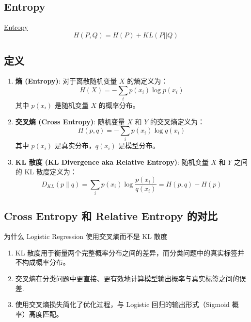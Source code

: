 \documentclass[12pt]{article}
\numberwithin{theorem}{section} %
\numberwithin{definition}{section} %
\numberwithin{assumption}{section} %
\numberwithin{lemma}{section} %
\numberwithin{remark}{section} %
\numberwithin{prop}{section} %
\numberwithin{corollary}{section} %
\numberwithin{example}{section} %
\numberwithin{question}{section} %
\numberwithin{problem}{section} %
\numberwithin{conjecture}{section} %
\numberwithin{append}{section} %
\numberwithin{property}{section} %
\begin{document}
\begin{CJK}{UTF8}{gbsn}
\section{Entropy}
\href{https://www.iitg.ac.in/cseweb/osint/slides/Anasua_Entropy.pdf}{Entropy} 
\begin{equation}
	H(P,Q) = H(P) + KL(P||Q)
\end{equation}

	
\subsection{定义}
	
	\begin{enumerate}
		\item \textbf{熵 (Entropy)}: 对于离散随机变量 \( X \) 的熵定义为：
		\begin{equation}
			H(X) = -\sum_{i} p(x_i) \log p(x_i)
		\end{equation}
		其中 \( p(x_i) \) 是随机变量 \( X \) 的概率分布。
		
		\item \textbf{交叉熵 (Cross Entropy)}: 随机变量 \( X \) 和 \( Y \) 的交叉熵定义为：
		\begin{equation}
			H(p, q) = -\sum_{i} p(x_i) \log q(x_i)
		\end{equation}
		其中 \( p(x_i) \) 是真实分布，\( q(x_i) \) 是模型分布。
		
		\item \textbf{KL 散度 (KL Divergence  aka Relative Entropy)}: 随机变量 \( X \) 和 \( Y \) 之间的 KL 散度定义为：
		\begin{equation}
			D_{KL}(p \parallel q) = \sum_{i} p(x_i) \log \frac{p(x_i)}{q(x_i)} = H(p, q) - H(p)
		\end{equation}
	\end{enumerate}
	
	\subsection{Cross Entropy 和 Relative Entropy 的对比}
	
	 为什么 Logistic Regression 使用交叉熵而不是 KL 散度
	 
	 \begin{enumerate}
	 	\item KL 散度用于衡量两个完整概率分布之间的差异，而分类问题中的真实标签并不构成概率分布。
	 	\item 交叉熵在分类问题中更直接、更有效地计算模型输出概率与真实标签之间的误差.
	 	\item 使用交叉熵损失简化了优化过程，与 Logistic 回归的输出形式（Sigmoid 概率）高度匹配。
	 \end{enumerate}
	 

\end{CJK}
\end{document}
